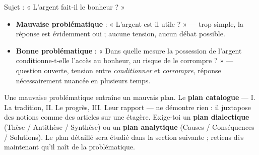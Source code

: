 \documentclass[11pt]{article}
\begin{document}
\begin{exemplebox}
Sujet : « L'argent fait-il le bonheur ? »
\begin{itemize}
\item \textbf{Mauvaise problématique} : « L'argent est-il utile ? » — trop simple, la réponse est évidemment oui ; aucune tension, aucun débat possible.
\item \textbf{Bonne problématique} : « Dans quelle mesure la possession de l'argent conditionne-t-elle l'accès au bonheur, au risque de le corrompre ? » — question ouverte, tension entre \emph{conditionner} et \emph{corrompre}, réponse nécessairement nuancée en plusieurs temps.
\end{itemize}
\end{exemplebox}

\begin{attention}
Une mauvaise problématique entraîne un mauvais plan. Le \textbf{plan catalogue} — I. La tradition, II. Le progrès, III. Leur rapport — ne démontre rien : il juxtapose des notions comme des articles sur une étagère. Exige-toi un \textbf{plan dialectique} (Thèse / Antithèse / Synthèse) ou un \textbf{plan analytique} (Causes / Conséquences / Solutions). Le plan détaillé sera étudié dans la section suivante ; retiens dès maintenant qu'il naît de la problématique.
\end{attention}
\end{document}
